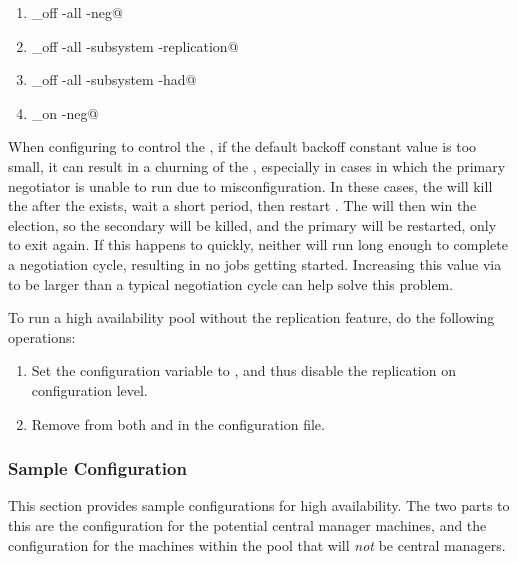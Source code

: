 \begin{enumerate}
\item \verb@condor_off -all -neg@
\item \verb@condor_off -all -subsystem -replication@
\item \verb@condor_off -all -subsystem -had@
\item \verb@condor_on -neg@
\end{enumerate}

When configuring  to control the ,
if the default backoff constant value is too small, it can result in
a churning of the , especially in cases in which the
primary negotiator is unable to run due to misconfiguration.
In these cases, the  will kill the  after
the  exists, wait a short period, then restart
.  The  will then win the election, so
the secondary  will be killed, and the primary
will be restarted, only to exit again.  If this happens to quickly,
neither  will run long enough to complete a negotiation
cycle, resulting in no jobs getting started.  Increasing this value
via 
to be larger than a typical negotiation cycle can help solve this
problem.

To run a high availability pool without the replication feature,
do the following operations:
\begin{enumerate}
  \item Set the  configuration 
  variable to ,
  and thus disable the replication on configuration level.

  \item Remove  from both  and
   in the configuration file.
\end{enumerate}


\subsubsection{\label{sec:HA-sample-config} Sample Configuration} 
This section provides sample configurations for high availability.
The two parts to this are the 
configuration for the potential central manager machines,
and the configuration for the
machines within the pool that will \emph{not} be
central managers.

